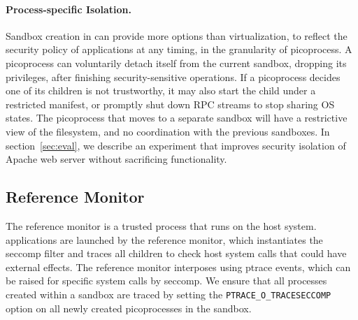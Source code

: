 \paragraph{Process-specific Isolation.} 
Sandbox creation in \sysname{} can provide
more options than virtualization, to reflect the security policy of applications at any timing,
in the granularity of picoprocess. 
A picoprocess can voluntarily detach itself from the current sandbox, dropping its privileges,
after finishing security-sensitive operations.
If a picoprocess decides one of its children is not trustworthy, it may also start the child under a restricted manifest,
or promptly shut down RPC streams to stop sharing OS states.
The picoprocess that moves to a separate sandbox will have a restrictive view of the filesystem, and no coordination with the previous sandboxes.
In section~\ref{sec:eval}, we describe an experiment that improves security isolation of Apache web server without sacrificing functionality.

\subsection{Reference Monitor}
\label{sec:graphene:security:monitor}

The reference monitor is a trusted process that runs on the host system.
\sysname{} applications are launched by the reference monitor,
which instantiates the seccomp filter and traces all children
to check host system calls that could have external effects.
The reference monitor interposes using ptrace events, 
which can be raised for specific system calls by seccomp.
We ensure that all processes created within a sandbox are traced
by setting the {\tt PTRACE\_O\_TRACESECCOMP} option on all newly created picoprocesses
in the sandbox.


